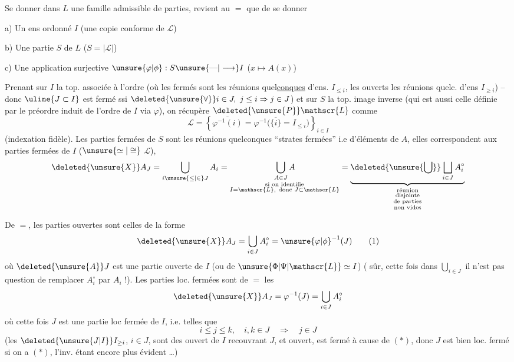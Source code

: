 Se donner dans $L$ une famille admissible  de parties, revient au $=$ que de se donner

a) Un ens ordonné $I$ \qquad (une copie conforme de $\mathscr{L}$)

b) Une partie $S$ de $L$ \qquad ($S=|\mathscr{L}|$)

c) Une application surjective $\unsure{\varphi|\phi}:S\unsure{\text{---}|\longrightarrow}I$ \quad ($x\mapsto A(x)$)

Prenant sur $I$ la top. associée à l'ordre (où les fermés sont les réunions quel\uline{conques} d'ens. $I_{\leq i}$, les ouverts les réunions quelc. d'ens $I_{\geq i}$) -- donc $\uline{\ensuremath{J\subset I}}$ est fermé ssi $\deleted{\unsure{\forall}}i\in J,\ j\leq i\Rightarrow j\in J$) et sur $S$ la top. image inverse (qui est aussi celle définie par le préordre induit de l'ordre de $I$ via $\varphi$),  on récupère $\deleted{\unsure{P}}\mathscr{L}$ comme
\[
 \mathscr{L}=\left\{\overline{\varphi^{-1}(i)}=\varphi^{-1}
 \bigl(\overline{\{i\}}=I_{\leq i}\bigr)\right\}_{i\in I}
\]
(indexation fidèle). Les parties fermées de $S$ sont les réunions quelconques  ``strates fermées'' i.e d'éléments de $A$, elles correspondent  aux parties fermées  de $I$ ($\unsure{\simeq|\cong}$  $\mathscr{L}$),  
\[
\deleted{\unsure{X}}A_J=\bigcup_{i\unsure{\leq|\in}J}A_i
 =\underset{\substack{\text{si on identifie}\\I=\mathscr{L},\ \text{donc }J\subset\mathscr{L}}}{\bigcup_{A\in J} A}
 =\underbrace{\deleted{\unsure{\bigcup}}\bigsqcup_{i\in J}A_i^\circ}_{\substack{\text{réunion}\\\text{disjointe}\\\text{de parties}\\\text{non vides}}}
\]
 

De $=$, les parties ouvertes sont celles de
la forme
\[
 \deleted{\unsure{X}}A_J=\bigcup_{i\in J}A_i^\circ={\unsure{\varphi|\phi}}^{-1}(J)
 \tag*{(1)}
\]
où $\deleted{\unsure{A}}J$ est une partie ouverte de $I$ (ou de $\unsure{\Phi|\Psi|\mathscr{L}}\simeq I$) ( sûr, cette fois dans $\displaystyle\bigcup_{i\in J}$ il n'est pas question de remplacer $A_i^\circ$ par $A_i$ !). Les parties loc. fermées sont de \ensuremath{=} les
\[
 \deleted{\unsure{X}}A_J=\varphi^{-1}(J)=\bigcup_{i\in J}A_i^\circ
\]
où cette fois $J$ est une partie loc fermée de $I$, i.e. telles que
\[
 i\leq j\leq k,\quad i,k\in J\quad\Rightarrow\quad j\in J
 \tag*{$(*)$}
\]
(les $\deleted{\unsure{J|I}}I_{\geq i}$, $i\in J$, sont des ouvert de $I$ recouvrant $J$, et  ouvert,  est fermé  à cause de $(*)$, donc $J$ est bien loc. fermé si on a $(*)$, l'inv. étant encore plus évident \ldots)

